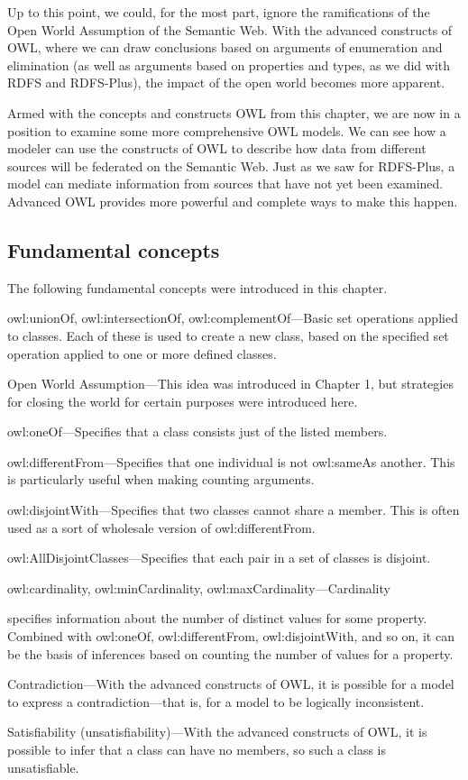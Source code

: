 Up to this point, we could, for the most part, ignore the ramifications
of the Open World Assumption of the Semantic Web. With the advanced
constructs of OWL, where we can draw conclusions based on arguments of
enumeration and elimination (as well as arguments based on properties
and types, as we did with RDFS and RDFS-Plus), the impact of the open
world becomes more apparent.

Armed with the concepts and constructs OWL from this chapter, we are now
in a position to examine some more comprehensive OWL models. We can see
how a modeler can use the constructs of OWL to describe how data from
different sources will be federated on the Semantic Web. Just as we saw
for RDFS-Plus, a model can mediate information from sources that have
not yet been examined. Advanced OWL provides more powerful and complete
ways to make this happen.

\subsection{Fundamental concepts}

The following fundamental concepts were introduced in this chapter.

owl:unionOf, owl:intersectionOf, owl:complementOf---Basic set operations
applied to classes. Each of these is used to create a new class, based
on the specified set operation applied to one or more defined classes.

Open World Assumption---This idea was introduced in Chapter 1, but
strategies for closing the world for certain purposes were introduced
here.

owl:oneOf---Specifies that a class consists just of the listed members.

owl:differentFrom---Specifies that one individual is not owl:sameAs
another. This is particularly useful when making counting arguments.

owl:disjointWith---Specifies that two classes cannot share a member.
This is often used as a sort of wholesale version of owl:differentFrom.

owl:AllDisjointClasses---Specifies that each pair in a set of classes is disjoint. 

owl:cardinality, owl:minCardinality, owl:maxCardinality---Cardinality

specifies information about the number of distinct values for some
property. Combined with owl:oneOf, owl:differentFrom, owl:disjointWith,
and so on, it can be the basis of inferences based on counting the
number of values for a property.

Contradiction---With the advanced constructs of OWL, it is possible for
a model to express a contradiction---that is, for a model to be
logically inconsistent.

Satisfiability (unsatisfiability)---With the advanced constructs of OWL,
it is possible to infer that a class can have no members, so such a
class is unsatisfiable.
